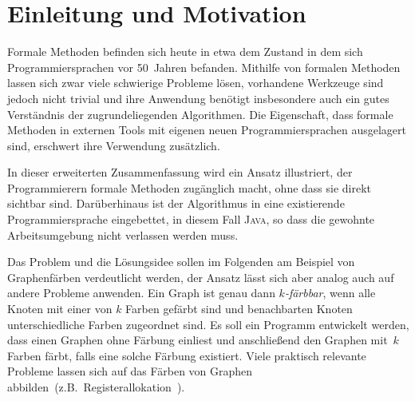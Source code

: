 \documentclass[a4paper,fontsize=12pt,headings=small,captions=tableheading,%
numbers=endperiod,abstracton,pdftex]{scrartcl}
\begin{document}
\section{Einleitung und Motivation}

Formale Methoden befinden sich heute in etwa dem Zustand in dem sich
Programmiersprachen vor 50~Jahren befanden.  Mithilfe von formalen Methoden
lassen sich zwar viele schwierige Probleme lösen, vorhandene Werkzeuge sind
jedoch nicht trivial und ihre Anwendung benötigt insbesondere auch ein gutes
Verständnis der zugrundeliegenden Algorithmen.  Die Eigenschaft, dass formale
Methoden in externen Tools mit eigenen neuen Programmiersprachen ausgelagert
sind, erschwert ihre Verwendung zusätzlich.

In dieser erweiterten Zusammenfassung wird ein Ansatz illustriert, der
Programmierern formale Methoden zugänglich macht, ohne dass sie direkt sichtbar
sind.  Darüberhinaus ist der Algorithmus in eine existierende Programmiersprache
eingebettet, in diesem Fall \textsc{Java}, so dass die gewohnte Arbeitsumgebung
nicht verlassen werden muss.

Das Problem und die Lösungsidee sollen im Folgenden am Beispiel von
Graphenfärben verdeutlicht werden, der Ansatz lässt sich aber analog auch auf
andere Probleme anwenden.  Ein Graph ist genau dann \emph{$k$-färbbar}, wenn
alle Knoten mit einer von $k$ Farben gefärbt sind und benachbarten Knoten
unterschiedliche Farben zugeordnet sind.  Es soll ein Programm entwickelt
werden, dass einen Graphen ohne Färbung einliest und anschließend den Graphen
mit~$k$ Farben färbt, falls eine solche Färbung existiert.  Viele praktisch
relevante Probleme lassen sich auf das Färben von Graphen
abbilden~(z.B.~Registerallokation~\cite{CAC+:81}).
\end{document}

